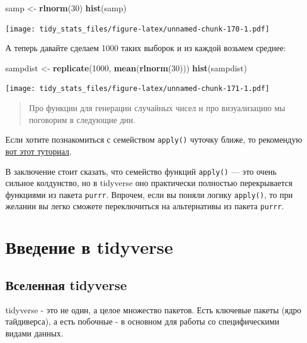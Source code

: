 \documentclass[]{book}
\newenvironment{Shaded}{\begin{snugshade}}{\end{snugshade}}
\newcommand{\KeywordTok}[1]{\textcolor[rgb]{0.13,0.29,0.53}{\textbf{#1}}}
\newcommand{\DecValTok}[1]{\textcolor[rgb]{0.00,0.00,0.81}{#1}}
\newcommand{\StringTok}[1]{\textcolor[rgb]{0.31,0.60,0.02}{#1}}
\newcommand{\NormalTok}[1]{#1}
\begin{document}
\begin{Shaded}
\begin{Highlighting}[]
\NormalTok{samp <-}\StringTok{ }\KeywordTok{rlnorm}\NormalTok{(}\DecValTok{30}\NormalTok{)}
\KeywordTok{hist}\NormalTok{(samp)}
\end{Highlighting}
\end{Shaded}

\texttt{[image: tidy\_stats\_files/figure-latex/unnamed-chunk-170-1.pdf]}

А теперь давайте сделаем 1000 таких выборок и из каждой возьмем среднее:

\begin{Shaded}
\begin{Highlighting}[]
\NormalTok{sampdist <-}\StringTok{ }\KeywordTok{replicate}\NormalTok{(}\DecValTok{1000}\NormalTok{, }\KeywordTok{mean}\NormalTok{(}\KeywordTok{rlnorm}\NormalTok{(}\DecValTok{30}\NormalTok{)))}
\KeywordTok{hist}\NormalTok{(sampdist)}
\end{Highlighting}
\end{Shaded}

\texttt{[image: tidy\_stats\_files/figure-latex/unnamed-chunk-171-1.pdf]}

\begin{quote}
Про функции для генерации случайных чисел и про визуализацию мы
поговорим в следующие дни.
\end{quote}

Если хотите познакомиться с семейством \texttt{apply()} чуточку ближе,
то рекомендую
\href{https://www.datacamp.com/community/tutorials/r-tutorial-apply-family}{вот
этот туториал}.

В заключение стоит сказать, что семейство функций \texttt{apply()} ---
это очень сильное колдунство, но в tidyverse оно практически полностью
перекрывается функциями из пакета \texttt{purrr}. Впрочем, если вы
поняли логику \texttt{apply()}, то при желании вы легко сможете
переключиться на альтернативы из пакета \texttt{purrr}.

\chapter{Введение в tidyverse}\label{tidy_intro}

\section{Вселенная tidyverse}\label{tidy_verse}

tidyverse - это не один, а целое множество пакетов. Есть ключевые пакеты
(ядро тайдиверса), а есть побочные - в основном для работы со
специфическими видами данных.
\end{document}
